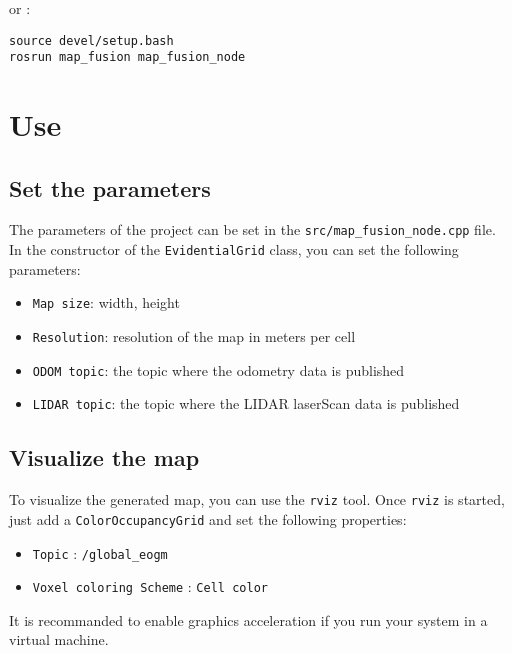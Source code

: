 or :

\begin{verbatim}
source devel/setup.bash
rosrun map_fusion map_fusion_node
\end{verbatim}

\section{Use}

\subsection{Set the parameters}

The parameters of the project can be set in the \texttt{src/map\_fusion\_node.cpp} file. In the constructor of the \texttt{EvidentialGrid} class, you can set the following parameters:

\begin{itemize}
    \item \texttt{Map size}: width, height
    \item \texttt{Resolution}: resolution of the map in meters per cell
    \item \texttt{ODOM topic}: the topic where the odometry data is published
    \item \texttt{LIDAR topic}: the topic where the LIDAR laserScan data is published
\end{itemize}

\subsection{Visualize the map}

To visualize the generated map, you can use the \texttt{rviz} tool. Once \texttt{rviz} is started, just add a \texttt{ColorOccupancyGrid} and set the following properties:

\begin{itemize}
    \item \texttt{Topic} : \texttt{/global\_eogm}
    \item \texttt{Voxel coloring Scheme} : \texttt{Cell color}
\end{itemize}

It is recommanded to enable graphics acceleration if you run your system in a virtual machine.